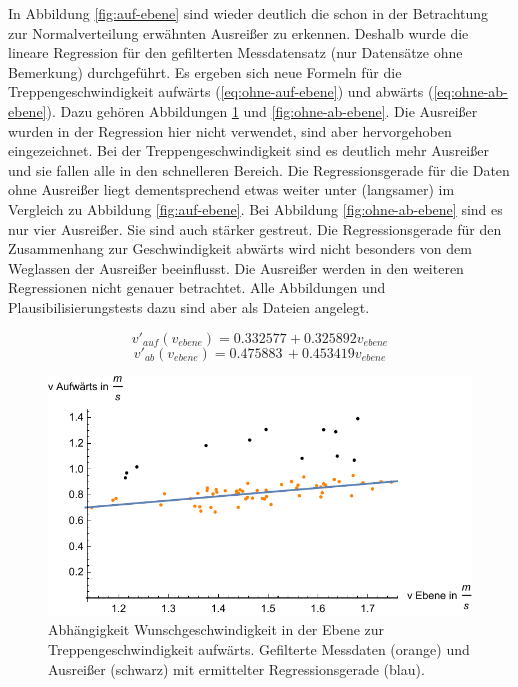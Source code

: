 In Abbildung \ref{fig:auf-ebene} sind wieder
deutlich die schon in der Betrachtung zur Normalverteilung erwähnten Ausreißer zu erkennen. Deshalb wurde die lineare Regression für den gefilterten Messdatensatz (nur Datensätze ohne Bemerkung) durchgeführt. Es ergeben sich neue Formeln für die Treppengeschwindigkeit aufwärts (\ref{eq:ohne-auf-ebene}) und abwärts (\ref{eq:ohne-ab-ebene}). Dazu gehören Abbildungen \ref{fig:ohne-auf-ebene} und \ref{fig:ohne-ab-ebene}. Die Ausreißer wurden in der Regression hier nicht verwendet, sind aber hervorgehoben eingezeichnet. Bei der Treppengeschwindigkeit sind es deutlich mehr Ausreißer und sie fallen alle in den schnelleren Bereich. Die Regressionsgerade für die Daten ohne Ausreißer liegt dementsprechend 
etwas weiter unter (langsamer) im Vergleich zu Abbildung \ref{fig:auf-ebene}. Bei Abbildung \ref{fig:ohne-ab-ebene} sind es nur 
vier Ausreißer. Sie sind auch stärker gestreut. Die Regressionsgerade für den Zusammenhang zur Geschwindigkeit abwärts wird nicht besonders von dem Weglassen der Ausreißer beeinflusst. Die Ausreißer werden in den weiteren Regressionen nicht genauer betrachtet. Alle Abbildungen und Plausibilisierungstests dazu sind aber als Dateien angelegt.

\begin{equation} \label{eq:ohne-auf-ebene}
	v'_{auf}(v_{ebene}) = 0.332577 +0.325892 v_{ebene}
\end{equation}
\begin{equation} \label{eq:ohne-ab-ebene}
	v'_{ab}(v_{ebene}) = 0.475883\, +0.453419 v_{ebene}
\end{equation}

\begin{figure} \centering 
	\includegraphics[]{abbildungen/regression/2017/ohneausreisser/auf-ebene.pdf}
	\caption{Abhängigkeit Wunschgeschwindigkeit in der Ebene zur Treppengeschwindigkeit aufwärts. Gefilterte Messdaten (orange) und Ausreißer (schwarz) mit ermittelter Regressionsgerade (blau). \label{fig:ohne-auf-ebene}}
\end{figure}

